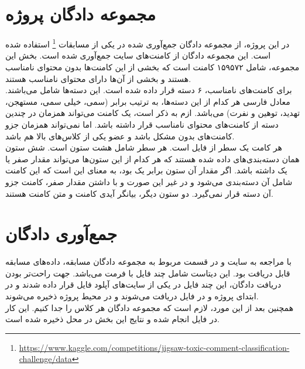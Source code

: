 \section{مجموعه دادگان پروژه}

\par
در این پروژه، از مجموعه دادگان جمع‌آوری شده در یکی از مسابقات \footnote{\url{https://www.kaggle.com/competitions/jigsaw-toxic-comment-classification-challenge/data}} استفاده شده است. این مجموعه دادگان از کامنت‌های سایت  جمع‌آوری شده است. بخش  این مجموعه، شامل ۱۵۹۵۷۲ کامنت است که بخشی از این کامنت‌ها بدون محتوای نامناسب هستند و بخشی از آن‌ها دارای محتوای نامناسب هستند. \\
برای کامنت‌های نامناسب، ۶ دسته قرار داده شده است. این دسته‌ها شامل  می‌باشند. معادل فارسی هر کدام از این دسته‌ها، به ترتیب برابر (سمی، خیلی سمی، مستهجن، تهدید، توهین و نفرت) می‌باشد. ازم به ذکر است، یک کامنت می‌تواند همزمان در چندین دسته از کامنت‌های محتوای نامناسب قرار داشته باشد. اما نمی‌تواند همزمان جزو کامنت‌های بدون مشکل باشد و عضو یکی از کلاس‌های بالا هم باشد. \\
هر کامت یک سطر از فایل  است. هر سطر شامل هشت ستون است. شش ستون همان دسته‌بندی‌های داده شده هستند که هر کدام از این ستون‌ها می‌تواند مقدار صفر یا یک داشته باشد. اگر مقدار آن ستون برابر یک بود، به معنای این است که این کامنت شامل آن دسته‌بندی می‌شود و در غیر این صورت و با داشتن مقدار صفر، کامنت جزو آن دسته قرار نمی‌گیرد.
دو ستون دیگر، بیانگر آیدی کامنت و متن کامنت هستند. \\

\section{جمع‌آوری دادگان}
\par
با مراجعه به سایت  و در قسمت مربوط به مجموعه دادگان مسابقه، داده‌های مسابقه قابل دریافت بود. این دیتاست شامل چند فایل با فرمت  می‌باشد. جهت راحت‌تر بودن دریافت دادگان، این چند فایل در یکی از سایت‌های آپلود فایل قرار داده شدند و در ابتدای پروژه و در فایل  دریافت می‌شوند و در محیط پروژه ذخیره می‌شوند. \\
همچنین بعد از این مورد، لازم است که مجموعه دادگان هر کلاس را جدا کنیم. این کار در فایل  انجام شده و نتایج این بخش در محل  ذخیره شده است.

